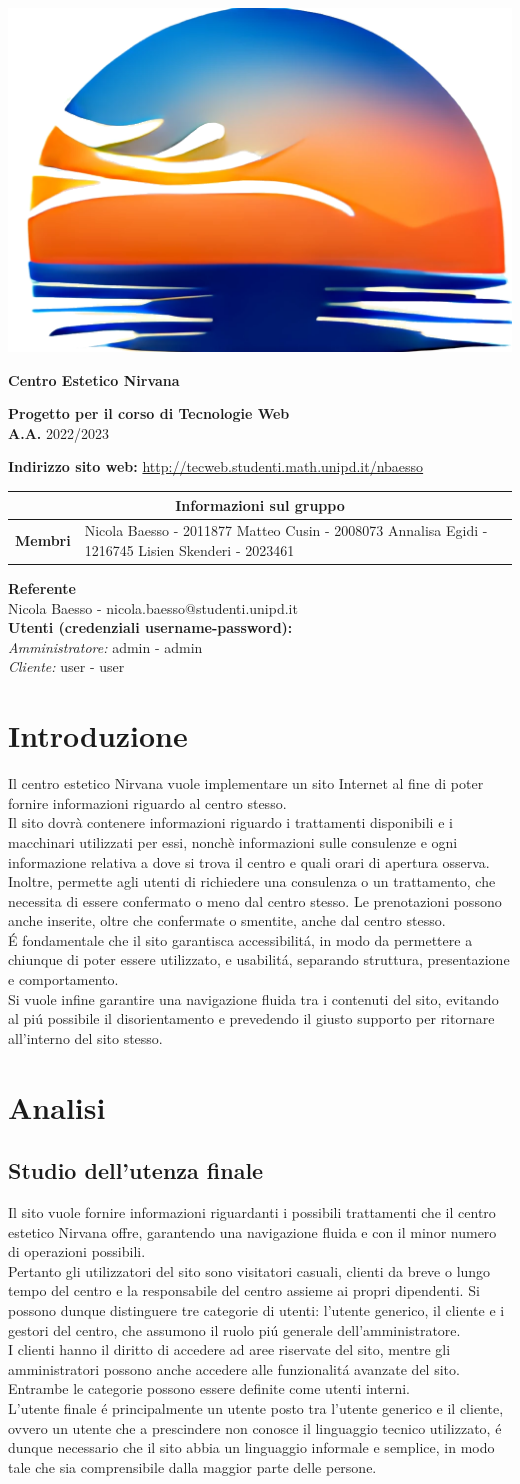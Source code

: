 \documentclass[]{article}
\makeatletter
\newcommand{\copertina}{
	\begin{titlepage}
		\begin{center}
			
			\includegraphics[width=0.4\linewidth]{graphics/icon2.png}\\
			\vspace{1cm}
			\begin{Huge}
				\textbf{Centro Estetico Nirvana} \\
			\end{Huge}
			
			\vspace{9pt}  
			
			\begin{large}
				\textbf{Progetto per il corso di Tecnologie Web\\}
				\textbf{A.A.} 2022/2023\\
				\vspace{3pt}
			\end{large}	  
			
			\vspace{24pt}
			
			\begin{large}
				\textbf{Indirizzo sito web:} \href{http://tecweb.studenti.math.unipd.it/nbaesso}{http://tecweb.studenti.math.unipd.it/nbaesso}\\
			\end{large} 
			
			\vspace{10pt} 
			
			\bgroup
			\def\arraystretch{1.3}
			\centering
			\begin{tabular}{r|L{5cm}}
			\multicolumn{2}{c}{\textbf{Informazioni sul gruppo} } \\ \hline
			\textbf{Membri} &  Nicola Baesso - 2011877 \newline Matteo Cusin - 2008073 \newline Annalisa Egidi - 1216745 \newline Lisien Skenderi - 2023461\\
			\end{tabular}
			\egroup
			
			\begin{center}
				\textbf{Referente\\}
				Nicola Baesso - nicola.baesso@studenti.unipd.it\\
				\textbf{Utenti (credenziali username-password):\\}
				\textit{Amministratore:} admin - admin\\
				\textit{Cliente:} user - user\\
			\end{center}
			
		\end{center}
	\end{titlepage}
}	%
\makeatother
\begin{document}
\copertina
\tableofcontents
\newpage
\section{Introduzione}
Il centro estetico Nirvana vuole implementare un sito Internet al fine di poter fornire informazioni riguardo al centro stesso.\\
Il sito dovrà contenere informazioni riguardo i trattamenti disponibili e i macchinari utilizzati per essi, nonchè informazioni sulle consulenze e ogni informazione relativa a dove si trova il centro e quali orari di apertura osserva.\\
Inoltre, permette agli utenti di richiedere una consulenza o un trattamento, che necessita di essere confermato o meno dal centro stesso. Le prenotazioni possono anche inserite, oltre che confermate o smentite, anche dal centro stesso.\\
É fondamentale che il sito garantisca accessibilitá, in modo da permettere a chiunque di poter essere utilizzato, e usabilitá, separando struttura, presentazione e comportamento.\\
Si vuole infine garantire una navigazione fluida tra i contenuti del sito, evitando al piú possibile il disorientamento e prevedendo il giusto supporto per ritornare all'interno del sito stesso.\\
\section{Analisi}
\subsection{Studio dell'utenza finale}
\label{analisi:utenza}
Il sito vuole fornire informazioni riguardanti i possibili trattamenti che il centro estetico Nirvana offre, garantendo una navigazione fluida e con il minor numero di operazioni possibili.\\
Pertanto gli utilizzatori del sito sono visitatori casuali, clienti da breve o lungo tempo del centro e la responsabile del centro assieme ai propri dipendenti.
Si possono dunque distinguere tre categorie di utenti: l'utente generico, il cliente e i gestori del centro, che assumono il ruolo piú generale dell'amministratore.\\
I clienti hanno il diritto di accedere ad aree riservate del sito, mentre gli amministratori possono anche accedere alle funzionalitá avanzate del sito. Entrambe le categorie possono essere definite come utenti interni.\\
L'utente finale é principalmente un utente posto tra l'utente generico e il cliente, ovvero un utente che a prescindere non conosce il linguaggio tecnico utilizzato, é dunque necessario che il sito abbia un linguaggio informale e semplice, in modo tale che sia comprensibile dalla maggior parte delle persone.
\end{document}
